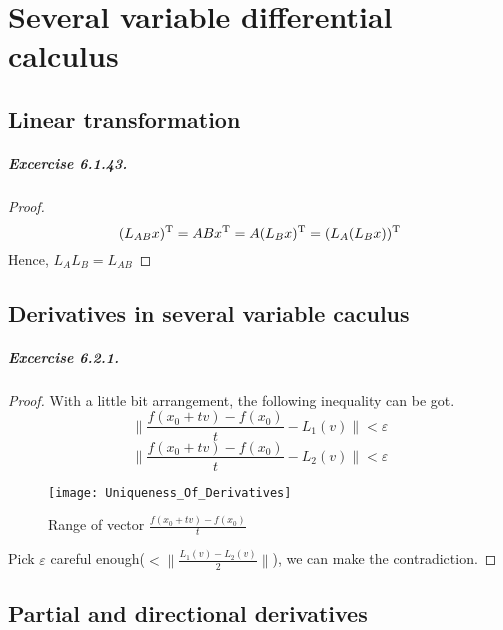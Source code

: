 \chapter{Several variable differential calculus}
\section{Linear transformation}
\paragraph{Excercise 6.1.43.}
\begin{proof}
\[(L_{AB}x)^{\mathrm T}=ABx^{\mathrm T}=A(L_{B}x)^{\mathrm T}=(L_{A}(L_{B}x))^{\mathrm T}
\]
Hence, $L_{A}L_{B}=L_{AB}$
\end{proof}
\section{Derivatives in several variable caculus}
\paragraph{Excercise 6.2.1.}
\begin{proof}With a little bit arrangement, the following inequality can be got.
\[\|\frac{f(x_{0}+tv)-f(x_{0})}{t}-L_{1}(v)\|<\varepsilon\]
\[\|\frac{f(x_{0}+tv)-f(x_{0})}{t}-L_{2}(v)\|<\varepsilon\]
\begin{figure}[H]
\centering
\texttt{[image: Uniqueness\_Of\_Derivatives]}
\caption{Range of vector $\frac{f(x_{0}+tv)-f(x_{0})}{t}$}
\end{figure}
Pick $\varepsilon$ careful enough($<\|\frac{L_{1}(v)-L_{2}(v)}{2}\|$), we can make the contradiction.
\end{proof}
\section{Partial and directional derivatives}
